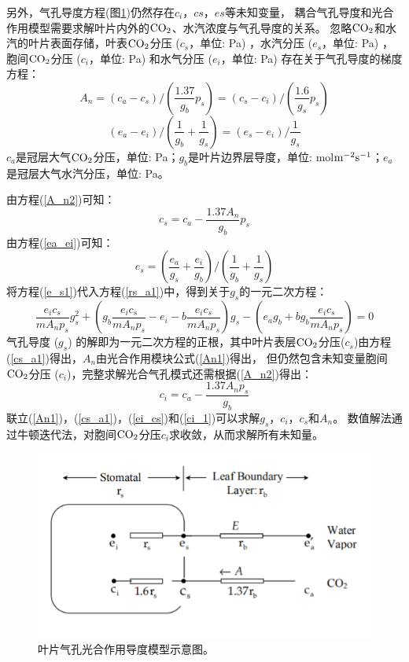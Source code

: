 另外，气孔导度方程(图\ref{fig:叶片气孔光合作用导度模型示意图})仍然存在$c_i$，$cs$，$es$等未知变量，
耦合气孔导度和光合作用模型需要求解叶片内外的$\rm CO_2$、水汽浓度与气孔导度的关系。
忽略$\rm CO_2$和水汽的叶片表面存储，叶表$\rm CO_2$分压 ($c_s$，单位: Pa) ，水汽分压 ($e_s$，单位: Pa) ，胞间$\rm CO_2$分压 ($c_i$，单位: Pa) 和水气分压 ($e_i$，单位: Pa) 存在关于气孔导度的梯度方程：
\begin{equation}\label{A_n2}
A_{n}=\left(c_{a}-c_{s}\right) /\left(\frac{1.37}{g_{b}} p_{s}\right)=\left(c_{s}-c_{i}\right) /\left(\frac{1.6}{g_{s}} p_{s}\right)
\end{equation}
\begin{equation}\label{ea_ei}
\left(e_{a}-e_{i}\right) /\left(\frac{1}{g_{b}}+\frac{1}{g_{s}}\right)=\left(e_{s}-e_{i}\right) / \frac{1}{g_{s}}
\end{equation}
$c_a$是冠层大气$\rm CO_2$分压，单位: Pa；$g_b$是叶片边界层导度，单位: mol$\rm m^{-2}s^{-1}$；$e_a$是冠层大气水汽分压，单位: Pa。

由方程(\ref{A_n2})可知：
\begin{equation}\label{cs_a1}
c_{s}=c_{a}-\frac{1.37 A_{n}}{g_{b}} p_{s}
\end{equation}
由方程(\ref{ea_ei})可知：
\begin{equation}\label{e_s1}
e_{s}=\left(\frac{e_{a}}{g_{s}}+\frac{e_{i}}{g_{b}}\right) /\left(\frac{1}{g_{b}}+\frac{1}{g_{s}}\right)
\end{equation}
将方程(\ref{e_s1})代入方程(\ref{rs_a1})中，得到关于$g_s$的一元二次方程：
\begin{equation}\label{ei_cs}
\frac{e_{i} c_{s}}{m A_{n} p_{s}} g_{s}^{2}+\left(g_{b} \frac{e_{i} c_{s}}{m A_{n} p_{s}}-e_{i}-b \frac{e_{i} c_{s}}{m A_{n} p_{s}}\right) g_{s}
-\left(e_{a} g_{b}+b g_{b} \frac{e_{i} c_{s}}{m A_{n} p_{s}}\right)=0
\end{equation}
气孔导度 ($g_s$) 的解即为一元二次方程的正根，其中叶片表层$\rm CO_2$分压($c_s$)由方程(\ref{cs_a1})得出，$A_n$由光合作用模块公式(\ref{An1})得出，
但仍然包含未知变量胞间$\rm CO_2$分压 ($c_i$)，完整求解光合气孔模式还需根据(\ref{A_n2})得出：
\begin{equation}\label{ci_1}
c_{i}=c_{a}-\frac{1.37 A_{n} p_{s}}{g_{b}}
\end{equation}
联立(\ref{An1})，(\ref{cs_a1})，(\ref{ei_cs})和(\ref{ci_1})可以求解$g_s$，$c_i$，$c_s$和$A_n$。
数值解法通过牛顿迭代法，对胞间$\rm CO_2$分压$c_i$求收敛，从而求解所有未知量。

{
\begin{figure}[]
\centering
\includegraphics{Figures/气孔导度和光合作用/叶片气孔光合作用导度模型示意图.png}
\caption{叶片气孔光合作用导度模型示意图。}
\label{fig:叶片气孔光合作用导度模型示意图}
\end{figure}
}
